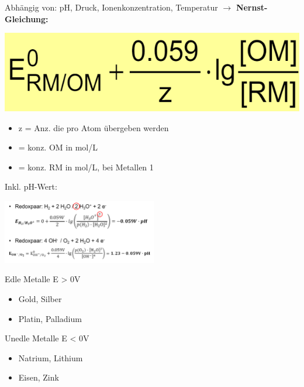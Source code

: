     Abhängig von: pH, Druck, Ionenkonzentration, Temperatur $\to$ \textbf{Nernst-Gleichung:}

    


    \begin{minipage}{0.4\linewidth}
        \includegraphics[width=\linewidth]{pictures/Nernst.png}
    \end{minipage}
    \hfill
    \begin{minipage}{0.55\linewidth}
        \begin{itemize}
            \item z = Anz.  die pro Atom übergeben werden
            \item \ce{[OM]} = konz. OM in mol/L
            \item \ce{[RM]} = konz. RM in mol/L, bei Metallen 1
        \end{itemize}
    \end{minipage}


     \begin{minipage}{0.65\linewidth}
        Inkl. pH-Wert:

        \includegraphics[height=2.8cm]{pictures/Nernstph.png}
    \end{minipage}
    \hfill
    \begin{minipage}{0.3\linewidth}
        Edle Metalle E > 0V
        \begin{itemize}
            \item Gold, Silber
            \item Platin, Palladium
        \end{itemize}
        Unedle Metalle E < 0V
        \begin{itemize}
            \item Natrium, Lithium
            \item Eisen, Zink
        \end{itemize}
    \end{minipage}